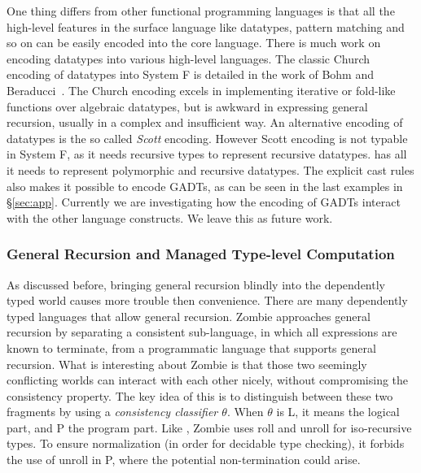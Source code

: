 One thing \name differs from other functional programming languages is that all the high-level features in the surface language like datatypes, pattern matching and so on can be easily encoded into the core language. There is much work on encoding datatypes into various high-level languages. The classic Church encoding of datatypes into System F is detailed in the work of Bohm and Beraducci~\cite{Bohm1985}. The Church encoding excels in implementing iterative or fold-like functions over algebraic datatypes, but is awkward in expressing general recursion, usually in a complex and insufficient way. An alternative encoding of datatypes is the so called \emph{Scott} encoding. However Scott encoding is not typable in System F, as it needs recursive types to represent recursive datatypes. \name has all it needs to represent polymorphic and recursive datatypes. The explicit cast rules also makes it possible to encode GADTs, as can be seen in the last examples in \S\ref{sec:app}. Currently we are investigating how the encoding of GADTs interact with the other language constructs. We leave this as future work.

\subsubsection{General Recursion and Managed Type-level Computation}

As discussed before, bringing general recursion blindly into the dependently typed world causes more trouble then convenience. There are many dependently typed languages that allow general recursion. Zombie approaches general recursion by separating a consistent sub-language, in which all expressions are known to terminate, from a programmatic language that supports general recursion. What is interesting about Zombie is that those two seemingly conflicting worlds can interact with each other nicely, without compromising the consistency property. The key idea of this is to distinguish between these two fragments by using a \emph{consistency classifier $\theta$}. When $\theta$ is \textsf{L}, it means the logical part, and \textsf{P} the program part. Like \name, Zombie uses \textsf{roll} and \textsf{unroll} for iso-recursive types. To ensure normalization (in order for decidable type checking), it forbids the use of \textsf{unroll} in \textsf{P}, where the potential non-termination could arise.

